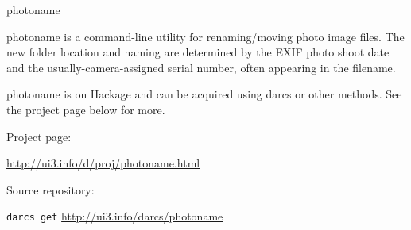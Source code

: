 \begin{hcarentry}{photoname}
\label{photoname}
\makeheader

photoname is a command-line utility for renaming/moving photo image files. The new folder location and naming are determined by the EXIF photo shoot date and the usually-camera-assigned serial number, often appearing in the filename.

photoname is on Hackage and can be acquired using darcs or other methods. See the project page below for more.

\FurtherReading
\begin{compactitem}
\item Project page:

\url{http://ui3.info/d/proj/photoname.html}

\item Source repository:

\texttt{darcs get} \url{http://ui3.info/darcs/photoname}
\end{compactitem}
\end{hcarentry}
